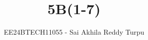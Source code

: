\documentclass[journal]{IEEEtran}
\begin{document}

\vspace{3cm}

\title{5B(1-7)}
\author{EE24BTECH11055 - Sai Akhila Reddy Turpu}
{\let\newpage\relax\maketitle}

\renewcommand{\thefigure}{\theenumi}
\renewcommand{\thetable}{\theenumi}
\setlength{\intextsep}{10pt} %


\renewcommand{\thetable}{\theenumi}
\end{document}
